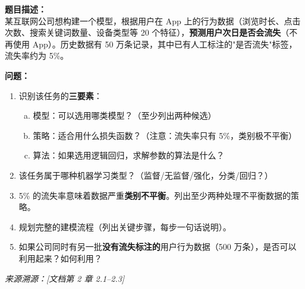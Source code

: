 \documentclass[a4paper,11pt]{ctexart}
\begin{document}
\begin{problembox}
    \textbf{题目描述：}\\
    某互联网公司想构建一个模型，根据用户在 App 上的行为数据（浏览时长、点击次数、搜索关键词数量、设备类型等 20 个特征），\textbf{预测用户次日是否会流失}（不再使用 App）。历史数据有 50 万条记录，其中已有人工标注的"是否流失"标签，流失率约为 5\%。

    \vspace{0.2cm}
    \textbf{问题：}
    \begin{enumerate}[(1)]
        \item 识别该任务的\textbf{三要素}：
        \begin{enumerate}[a.]
            \item 模型：可以选用哪类模型？（至少列出两种候选）
            \item 策略：适合用什么损失函数？（注意：流失率只有 5\%，类别极不平衡）
            \item 算法：如果选用逻辑回归，求解参数的算法是什么？
        \end{enumerate}
        \item 该任务属于哪种机器学习类型？（监督/无监督/强化，分类/回归？）
        \item 5\% 的流失率意味着数据严重\textbf{类别不平衡}。列出至少两种处理不平衡数据的策略。
        \item 规划完整的建模流程（列出关键步骤，每步一句话说明）。
        \item 如果公司同时有另一批\textbf{没有流失标注的}用户行为数据（500 万条），是否可以利用起来？如何利用？
    \end{enumerate}
    {\color{gray}\small\textit{来源溯源：[文档第 2 章 2.1--2.3]}}
\end{problembox}
\end{document}
